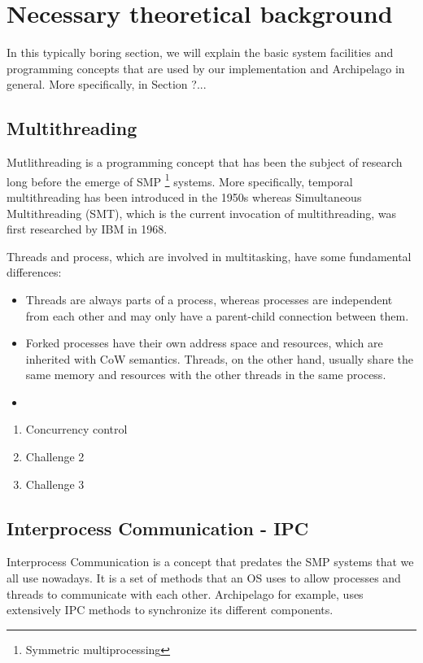 \chapter{Necessary theoretical background}\label{ch:theory}

In this typically boring section, we will explain the basic system facilities 
and programming concepts that are used by our implementation and Archipelago in 
general. More specifically, in Section ?...

\section{Multithreading}

Mutlithreading is a programming concept that has been the subject of research 
long before the emerge of SMP
\footnote{Symmetric multiprocessing}
systems. More specifically, temporal multithreading has been introduced in the 
1950s whereas Simultaneous Multithreading (SMT), which is the current 
invocation of multithreading, was first researched by IBM in 1968\cite{mt}.

Threads and process, which are involved in multitasking, have some fundamental 
differences:

\begin{itemize}
	\item Threads are always parts of a process, whereas processes are 
		independent from each other and may only have a parent-child connection 
		between them.
	\item Forked processes have their own address space and resources, which 
		are inherited with CoW semantics. Threads, on the other hand, usually 
		share the same memory and resources with the other threads in the same 
		process.
	\item
	
\end{itemize}


\begin{enumerate}
	\item Concurrency control
	\item Challenge 2
	\item Challenge 3
\end{enumerate}

\section{Interprocess Communication - IPC}

Interprocess Communication is a concept that predates the SMP systems that we 
all use nowadays. It is a set of methods that an OS uses to allow processes and 
threads to communicate with each other. Archipelago for example, uses 
extensively IPC methods to synchronize its different components.

